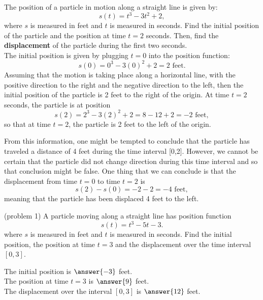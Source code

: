 \documentclass{ximera}
\begin{document}
\begin{example}[example 1]
The position  of a particle in motion along a straight line is given by:
\[s(t) = t^3 - 3t^2 + 2,\]
where $s$ is measured in feet and $t$ is measured in seconds.
Find the initial position of the particle and the position at time $t = 2$ seconds.
Then, find the \textbf{displacement} of the particle during the first two seconds.\\

The initial position is given by plugging $t=0$ into the position function: 
\[s(0) = 0^3 -3(0)^2 + 2 = 2 \text{ feet}.\]
Assuming that the motion is taking place along a horizontal line,
with the positive direction to the right and the negative direction to the left, then the initial position 
of the particle is 2 feet to the right of the origin.
At time $t=2$ seconds, the particle is at position
\[s(2) = 2^3 -3(2)^2 + 2 = 8 - 12 + 2 = -2 \text{ feet},\]
so that at time $t = 2$, the particle is 2 feet to the left of the origin.
\begin{center}
\end{center}

From this information, one might be tempted to conclude that the particle has traveled a distance  of 4 feet
during the time interval [0,2].  However, we cannot be certain that the particle did not change direction 
during this time interval and so that conclusion might be false. 
One thing that we can conclude is that the displacement from 
time $t = 0$ to time $t = 2$ is
\[s(2) - s(0) = -2 - 2 = -4 \text{ feet},\]
meaning that the particle has been displaced 4 feet to the left. 
 




\end{example}



\begin{problem}(problem 1)
A particle moving along a straight line has position function
\[s(t) = t^3 - 5t -3.\]
where $s$ is measured in feet and $t$ is measured in seconds.
Find the initial position, the position at time $t = 3$ 
and the displacement over the time interval $[0,3]$.

The initial position is $\answer{-3}$ feet.\\
The position at time $t=3$ is $\answer{9}$ feet.\\
The displacement over the interval $[0,3]$ is $\answer{12}$ feet.\\

\end{problem}
\end{document}
